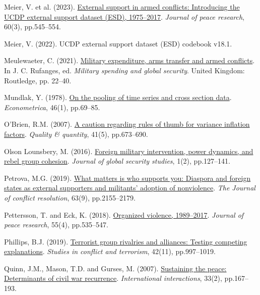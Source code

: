 \documentclass[
]{article}
\newlength{\cslhangindent}
\newenvironment{CSLReferences}[2] %
 {\begin{list}{}{%
  \setlength{\itemindent}{0pt}
  \setlength{\leftmargin}{0pt}
  \setlength{\parsep}{0pt}
  \ifodd #1
   \setlength{\leftmargin}{\cslhangindent}
   \setlength{\itemindent}{-1\cslhangindent}
  \fi
  \setlength{\itemsep}{#2\baselineskip}}}
 {\end{list}}
\begin{document}
\begin{CSLReferences}{0}{1}
Meier, V. et al. (2023).
\href{https://doi.org/10.1177/00223433221079864}{External support in
armed conflicts: Introducing the UCDP external support dataset (ESD),
1975--2017}. \emph{Journal of peace research}, 60(3), pp.545--554.

Meier, V. (2022). UCDP external support dataset (ESD) codebook v18.1.

Meulewaeter, C. (2021).
\href{https://doi.org/10.4324/9781003045823-3}{Military expenditure,
arms transfer and armed conflicts}. In J. C. Rufanges, ed.
\emph{Military spending and global security}. United Kingdom: Routledge,
pp. 22--40.

Mundlak, Y. (1978). \href{https://doi.org/10.2307/1913646}{On the
pooling of time series and cross section data}. \emph{Econometrica},
46(1), pp.69--85.

O'Brien, R.M. (2007). \href{https://doi.org/10.1007/s11135-006-9018-6}{A
caution regarding rules of thumb for variance inflation factors}.
\emph{Quality \& quantity}, 41(5), pp.673--690.

Olson Lounsbery, M. (2016).
\href{https://doi.org/10.1093/jogss/ogw004}{Foreign military
intervention, power dynamics, and rebel group cohesion}. \emph{Journal
of global security studies}, 1(2), pp.127--141.

Petrova, M.G. (2019).
\href{https://doi.org/10.1177/0022002719826645}{What matters is who
supports you: Diaspora and foreign states as external supporters and
militants' adoption of nonviolence}. \emph{The Journal of conflict
resolution}, 63(9), pp.2155--2179.

Pettersson, T. and Eck, K. (2018).
\href{https://doi.org/10.1177/0022343318784101}{Organized violence,
1989--2017}. \emph{Journal of peace research}, 55(4), pp.535--547.

Phillips, B.J. (2019).
\href{https://doi.org/10.1080/1057610X.2018.1431365}{Terrorist group
rivalries and alliances: Testing competing explanations}. \emph{Studies
in conflict and terrorism}, 42(11), pp.997--1019.

Quinn, J.M., Mason, T.D. and Gurses, M. (2007).
\href{https://doi.org/10.1080/03050620701277673}{Sustaining the peace:
Determinants of civil war recurrence}. \emph{International
interactions}, 33(2), pp.167--193.


\end{CSLReferences}
\end{document}
